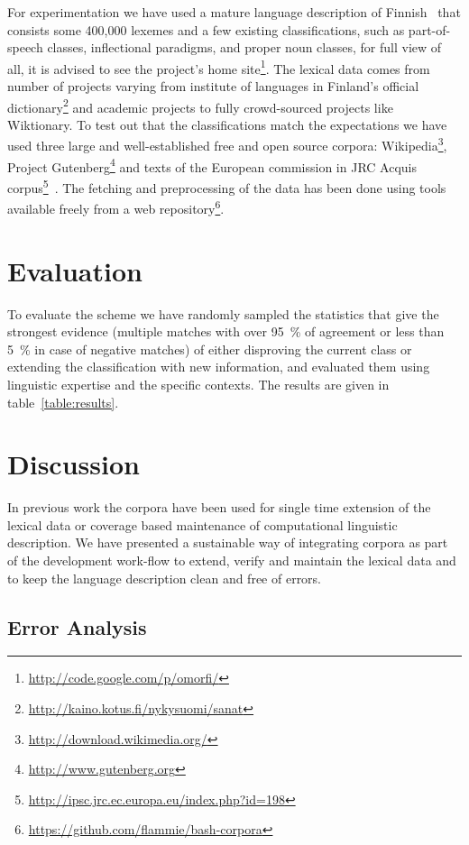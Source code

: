 \documentclass[a5paper]{article}
\begin{document}
For experimentation we have used a mature language description of
Finn\-ish~\cite{pirinen2008suomen} that consists some 400,000 lexemes and a few
existing classifications, such as part-of-speech classes, inflectional
paradigms, and proper noun classes, for full view of all, it is advised to see
the project's home site\footnote{\url{http://code.google.com/p/omorfi/}}. The
lexical data comes from number of projects varying from institute of languages
in Finland's official
dictionary\footnote{\url{http://kaino.kotus.fi/nykysuomi/sanat}} and academic
projects to fully crowd-sourced projects like Wiktionary. To test out that the
classifications match the expectations we have used three large and
well-established free and open source corpora:
Wikipedia\footnote{\url{http://download.wikimedia.org/}}, Project
Gutenberg\footnote{\url{http://www.gutenberg.org}} and texts of the European
commission in JRC Acquis
corpus\footnote{\url{http://ipsc.jrc.ec.europa.eu/index.php?id=198}}~\cite{steinberger2006jrc}.
The fetching and preprocessing of the data has been done using tools available
freely from a web
repository\footnote{\url{https://github.com/flammie/bash-corpora}}.

\section{Evaluation}

To evaluate the scheme we have randomly sampled the statistics that give the
strongest evidence (multiple matches with over 95~\% of agreement or less than 
5~\% in case of negative matches) of either
disproving the current class or extending the classification with new
information, and evaluated them using linguistic expertise and the specific
contexts. The results are given in table~\ref{table:results}.

\section{Discussion}

In previous work the corpora have been used for single time extension of the
lexical data or coverage based maintenance of computational linguistic
description. We have presented a sustainable way of integrating corpora as part
of the development work-flow to extend, verify and maintain the lexical data
and to keep the language description clean and free of errors.

\subsection{Error Analysis}
\end{document}
